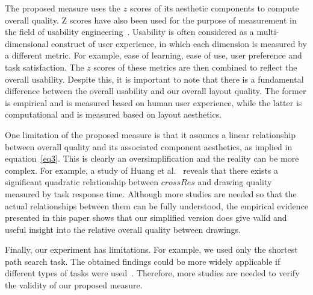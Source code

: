 \documentclass[conference,letterpaper]{IEEEtran}
\begin{document}
The proposed measure uses the $z$ scores of its aesthetic components to compute overall quality. Z scores have also been used for the purpose of measurement in the field of usability engineering~\cite{tullis08}. Usability is often considered as a multi-dimensional construct of user experience, in which each dimension is measured by a different metric. For example, ease of learning, ease of use, user preference and task satisfaction. The $z$ scores of these metrics are then combined to reflect the overall usability. Despite this, it is important to note that there is a fundamental difference between the overall usability and our overall layout quality. The former is empirical and is measured based on human user experience, while the latter is computational and is measured based on layout aesthetics.

One limitation of the proposed measure is that it assumes a linear relationship between overall quality and its associated component aesthetics, as implied in equation~\ref{eq3}.  This is clearly \newpage \noindent an  oversimplification and the reality can be more complex. For example, a study of Huang et al.~\cite{huang08} reveals that there exists a significant quadratic relationship between $crossRes$ and drawing quality measured by task response time. Although more studies are needed so that the actual relationships between them can be fully understood, the empirical evidence presented in this paper shows that our simplified version does give valid and useful insight into the relative overall quality between drawings.

Finally, our experiment has limitations. For example, we used only the shortest path search task. The obtained findings could be more widely applicable if different types of tasks were used~\cite{lee06}. Therefore, more studies are needed to verify the validity of our proposed measure. 
\end{document}
